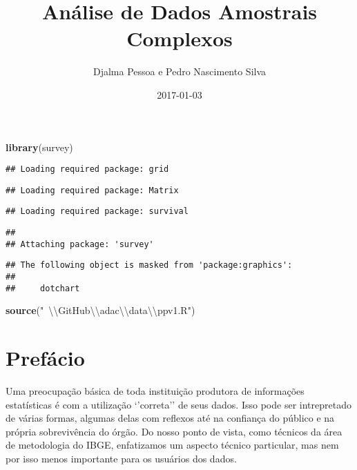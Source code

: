 \documentclass[]{book}
\title{Análise de Dados Amostrais Complexos}
\author{Djalma Pessoa e Pedro Nascimento Silva}
\date{2017-01-03}
\newenvironment{Shaded}{\begin{snugshade}}{\end{snugshade}}
\newcommand{\KeywordTok}[1]{\textcolor[rgb]{0.13,0.29,0.53}{\textbf{{#1}}}}
\newcommand{\CharTok}[1]{\textcolor[rgb]{0.31,0.60,0.02}{{#1}}}
\newcommand{\StringTok}[1]{\textcolor[rgb]{0.31,0.60,0.02}{{#1}}}
\newcommand{\NormalTok}[1]{{#1}}
\begin{document}
\maketitle

{
\setcounter{tocdepth}{1}
\tableofcontents
}
\begin{Shaded}
\begin{Highlighting}[]
\KeywordTok{library}\NormalTok{(survey)}
\end{Highlighting}
\end{Shaded}

\begin{verbatim}
## Loading required package: grid
\end{verbatim}

\begin{verbatim}
## Loading required package: Matrix
\end{verbatim}

\begin{verbatim}
## Loading required package: survival
\end{verbatim}

\begin{verbatim}
## 
## Attaching package: 'survey'
\end{verbatim}

\begin{verbatim}
## The following object is masked from 'package:graphics':
## 
##     dotchart
\end{verbatim}

\begin{Shaded}
\begin{Highlighting}[]
\KeywordTok{source}\NormalTok{(}\StringTok{"~}\CharTok{\textbackslash{}\textbackslash{}}\StringTok{GitHub}\CharTok{\textbackslash{}\textbackslash{}}\StringTok{adac}\CharTok{\textbackslash{}\textbackslash{}}\StringTok{data}\CharTok{\textbackslash{}\textbackslash{}}\StringTok{ppv1.R"}\NormalTok{)}
\end{Highlighting}
\end{Shaded}

\chapter*{Prefácio}\label{prefacio}

Uma preocupação básica de toda instituição produtora de informações
estatísticas é com a utilização `'correta'' de seus dados. Isso pode ser
intrepretado de várias formas, algumas delas com reflexos até na
confiança do público e na própria sobrevivência do órgão. Do nosso ponto
de vista, como técnicos da área de metodologia do IBGE, enfatizamos um
aspecto técnico particular, mas nem por isso menos importante para os
usuários dos dados.
\end{document}
